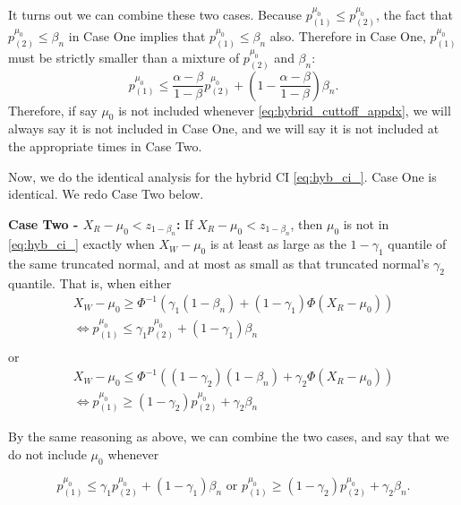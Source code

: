 \documentclass{article}
\begin{document}
\begin{appendix}
It turns out we can combine these two cases. Because $p^{\mu_0}_{(1)} \leq p^{\mu_0}_{(2)}$, the fact that $p^{\mu_0}_{(2)} \leq  \beta_n$ in Case One implies that $p^{\mu_0}_{(1)} \leq \beta_n$ also. Therefore in Case One, $p^{\mu_0}_{(1)}$ must be strictly smaller than a mixture of $p^{\mu_0}_{(2)}$ and $\beta_n$:
\begin{equation}
    \label{eq:hybrid_cuttoff_appdx}
    p^{\mu_0}_{(1)} \leq  \frac{\alpha-\beta}{1-\beta}p^{\mu_0}_{(2)}  + \left(1 - \frac{\alpha - \beta}{1 - \beta}\right)\beta_n. 
\end{equation}
Therefore, if say $\mu_0$ is not included whenever \eqref{eq:hybrid_cuttoff_appdx}, we will always say it is not included in Case One, and we will say it is not included at the appropriate times in Case Two. 

Now, we do the identical analysis for the hybrid CI \eqref{eq:hyb_ci_}. Case One is identical. We redo Case Two below. \newline

\noindent \textbf{Case Two - $X_R - \mu_0 < z_{1 - \beta_n}$:} If $X_R - \mu_0 < z_{1 - \beta_n}$, then $\mu_0$ is not in \eqref{eq:hyb_ci_} exactly when $X_W - \mu_0$ is at least as large as the $1 - \gamma_1$ quantile of the same truncated normal, and at most as small as that truncated normal's $\gamma_2$ quantile. That is, when either 
\begin{align*}
    X_{W} - \mu_0 \geq \Phi^{-1} \left( \gamma_1 (1- \beta_n) + (1-\gamma_1)\Phi(X_{R} - \mu_0) \right) \\
        \iff p^{\mu_0}_{(1)} \leq \gamma_1 p^{\mu_0}_{(2)}  + (1 -\gamma_1)\beta_n \\
\end{align*}
or 
\begin{align*}
    X_{W} - \mu_0 \leq \Phi^{-1} \left( (1 - \gamma_2) (1- \beta_n) + \gamma_2\Phi(X_{R} - \mu_0) \right) \\ 
    \iff p_{(1)}^{\mu_0} \geq (1- \gamma_2)p_{(2)}^{\mu_0} + \gamma_2 \beta_n
\end{align*}

By the same reasoning as above, we can combine the two cases, and say that we do not include $\mu_0$ whenever 

\begin{equation*}
    p^{\mu_0}_{(1)} \leq \gamma_1 p^{\mu_0}_{(2)}  + (1 -\gamma_1)\beta_n  \text{ or } p_{(1)}^{\mu_0} \geq (1- \gamma_2)p_{(2)}^{\mu_0} + \gamma_2 \beta_n.
\end{equation*}


\end{appendix}
\end{document}
